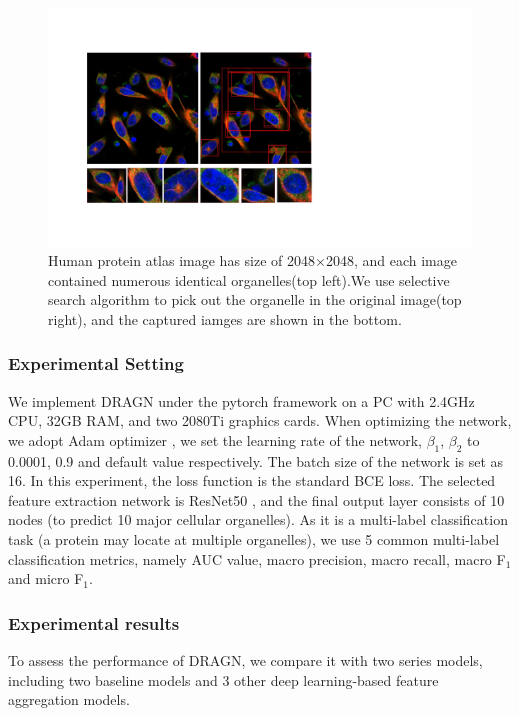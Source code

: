\documentclass[10pt,twocolumn,letterpaper]{article}
\begin{document}
\begin{figure}[t]
\begin{center}
\includegraphics[width=0.9\linewidth]{hpa.pdf}
\end{center}
\caption{Human protein atlas image has size of 2048$\times$2048, and each image contained numerous identical organelles(top left).We use selective search algorithm to pick out the organelle in the original image(top right), and the captured iamges are shown in the bottom. }
\label{fig:hpa}
\end{figure}

\subsubsection{Experimental Setting}
We implement DRAGN under the pytorch framework on a PC with 2.4GHz CPU, 32GB RAM, and two 2080Ti graphics cards. When optimizing the network, we adopt Adam optimizer \cite{ref25}, we set the learning rate of the network, $\beta_1$, $\beta_2$ to 0.0001, 0.9 and default value respectively. The batch size of the network is set as 16. In this experiment, the loss function is the standard BCE loss. The selected feature extraction network is ResNet50 \cite{he2016deep}, and the final output layer consists of 10 nodes (to predict 10 major cellular organelles). As it is a multi-label classification task (a protein may locate at multiple organelles), we use 5 common multi-label classification metrics, namely AUC value, macro precision, macro recall, macro F$_1$ and micro F$_1$.

\subsubsection{Experimental results}
To assess the performance of DRAGN, we compare it with two series models, including two baseline models and 3 other deep learning-based feature aggregation models. 
\end{document}
